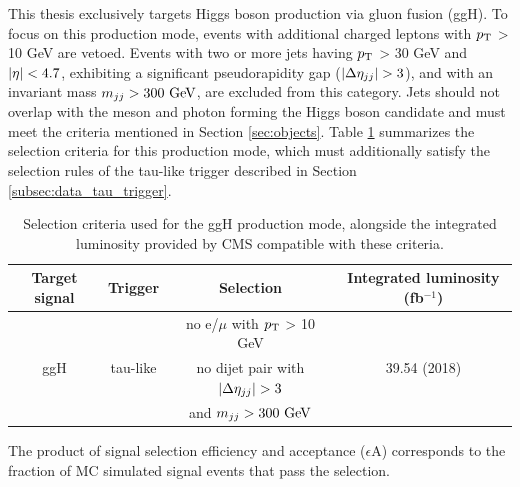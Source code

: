 This thesis exclusively targets Higgs boson production via gluon fusion (ggH). To focus on this production mode, events with additional charged leptons with $p_\text{T}$ > 10 GeV are vetoed. Events with two or more jets having $p_\text{T}$ > 30 GeV and $\left\lvert\eta\right\rvert < 4.7$, exhibiting a significant pseudorapidity gap ($\left\lvert\Delta\eta_{jj}\right\rvert > 3$), and with an invariant mass $m_{jj} > 300\ \text{GeV}$, are excluded from this category. Jets should not overlap with the meson and photon forming the Higgs boson candidate and must meet the criteria mentioned in Section \ref{sec:objects}. Table \ref{tab:triggers} summarizes the selection criteria for this production mode, which must additionally satisfy the selection rules of the tau-like trigger described in Section \ref{subsec:data_tau_trigger}.

\begin{table}[!ht]
    \centering
    \begin{tabular}{|c|c|c|c|}
    \hline
    \cellcolor{lightgray}Target signal   & \cellcolor{lightgray}Trigger & \cellcolor{lightgray}Selection & \cellcolor{lightgray}Integrated luminosity (fb$^{-1}$)\\ \hline
    \multirow{3}{*}{ggH}&\multirow{3}{*}{tau-like}  &no e/$\mu$ with $p_\text{T}$ > 10 GeV & \multirow{3}{*}{39.54 (2018)}\\
                        &                           &no dijet pair with $\left\lvert\Delta\eta_{jj}\right\rvert > 3$ & \\
                        &                           &and $m_{jj} > 300\ \text{GeV}$                       & \\
    \hline
    \end{tabular}
    \caption{Selection criteria used for the ggH production mode, alongside the integrated luminosity provided by CMS compatible with these criteria.}
    \label{tab:triggers}
\end{table}
The product of signal selection efficiency and acceptance ($\epsilon$A) corresponds to the fraction of MC simulated signal events that pass the selection.
